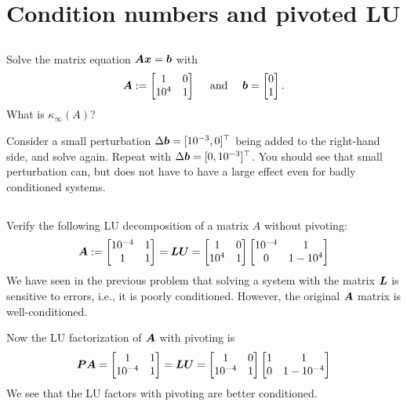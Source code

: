\documentclass[11pt,letterpaper]{article}
\begin{document}
 

\section{Condition numbers and pivoted LU}
\subsection{}
Solve the matrix equation $\boldsymbol{A}\boldsymbol{x} = \boldsymbol{b}$ with 
\begin{align*}
  \boldsymbol{A}:=
  \begin{bmatrix}
    1       & 0  \\
    10^{4}  & 1
  \end{bmatrix}
  \quad \mbox{ and } \quad
  \boldsymbol{b} = \begin{bmatrix}
  0\\1
  \end{bmatrix}.
\end{align*}
What is $\kappa_\infty(A)$?

Consider a small perturbation $\Delta \boldsymbol{b}=[10^{-3},0]^\top$ being added to the right-hand side, and solve again. Repeat with $\Delta \boldsymbol{b} =[0,10^{-3}]^\top$. You should see that small perturbation can, but does not have to have a large effect even for badly conditioned systems.

\subsection{}
Verify the following LU decomposition of a matrix $A$ without pivoting:
  $$
  \boldsymbol{A} := \begin{bmatrix} 10^{-4} & 1\\ 1 & 1
  \end{bmatrix} = \boldsymbol{L}\boldsymbol{U} =
  \begin{bmatrix} 1 & 0\\ 10^4 & 1
  \end{bmatrix}
  \begin{bmatrix} 10^{-4} & 1\\ 0 & 1-10^4
  \end{bmatrix}
  $$ 
We have seen in the previous problem that solving a system with the matrix $\boldsymbol{L}$ is sensitive to errors, i.e., it is poorly conditioned. However, the original $\boldsymbol{A}$ matrix is well-conditioned.

Now the LU factorization of $\boldsymbol{A}$ with pivoting is
\begin{align*}
\boldsymbol{P}\boldsymbol{A} = \begin{bmatrix} 1 & 1 \\ 10^{-4} & 1
  \end{bmatrix} = \boldsymbol{L}\boldsymbol{U} =
  \begin{bmatrix} 1 & 0\\ 10^{-4} & 1
  \end{bmatrix}
  \begin{bmatrix} 1 & 1\\ 0 & 1-10^{-4}
  \end{bmatrix}
\end{align*}
We see that the LU factors with pivoting are better conditioned.
\end{document}
